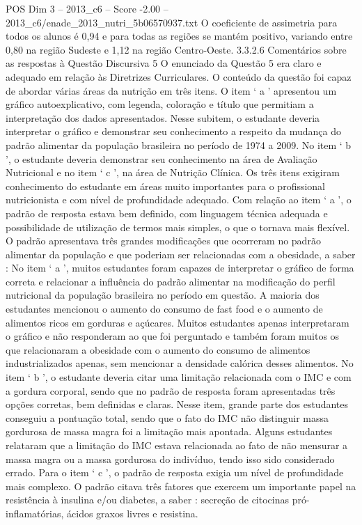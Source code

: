\begin{textsample}{POS Dim 3 – 2013\_c6 – Score -2.00 – 2013\_c6/enade\_2013\_nutri\_5b06570937.txt}
O coeficiente de assimetria para todos os alunos é 0,94 e para todas as regiões se mantém positivo, variando entre 0,80 na região Sudeste e 1,12 na região Centro-Oeste. 3.3.2.6 Comentários sobre as respostas à Questão Discursiva 5 O enunciado da Questão 5 era claro e adequado em relação às Diretrizes Curriculares.
O conteúdo da questão foi capaz de abordar várias áreas da nutrição em três itens.
O item ‘ a ’ apresentou um gráfico autoexplicativo, com legenda, coloração e título que permitiam a interpretação dos dados apresentados.
Nesse subitem, o estudante deveria interpretar o gráfico e demonstrar seu conhecimento a respeito da mudança do padrão alimentar da população brasileira no período de 1974 a 2009.
No item ‘ b ’, o estudante deveria demonstrar seu conhecimento na área de Avaliação Nutricional e no item ‘ c ’, na área de Nutrição Clínica.
Os três itens exigiram conhecimento do estudante em áreas muito importantes para o profissional nutricionista e com nível de profundidade adequado.
Com relação ao item ‘ a ’, o padrão de resposta estava bem definido, com linguagem técnica adequada e possibilidade de utilização de termos mais simples, o que o tornava mais flexível.
O padrão apresentava três grandes modificações que ocorreram no padrão alimentar da população e que poderiam ser relacionadas com a obesidade, a saber : No item ‘ a ’, muitos estudantes foram capazes de interpretar o gráfico de forma correta e relacionar a influência do padrão alimentar na modificação do perfil nutricional da população brasileira no período em questão.
A maioria dos estudantes mencionou o aumento do consumo de fast food e o aumento de alimentos ricos em gorduras e açúcares.
Muitos estudantes apenas interpretaram o gráfico e não responderam ao que foi perguntado e também foram muitos os que relacionaram a obesidade com o aumento do consumo de alimentos industrializados apenas, sem mencionar a densidade calórica desses alimentos.
No item ‘ b ’, o estudante deveria citar uma limitação relacionada com o IMC e com a gordura corporal, sendo que no padrão de resposta foram apresentadas três opções corretas, bem definidas e claras.
Nesse item, grande parte dos estudantes conseguiu a pontuação total, sendo que o fato do IMC não distinguir massa gordurosa de massa magra foi a limitação mais apontada.
Alguns estudantes relataram que a limitação do IMC estava relacionada ao fato de não mensurar a massa magra ou a massa gordurosa do indivíduo, tendo isso sido considerado errado.
Para o item ‘ c ’, o padrão de resposta exigia um nível de profundidade mais complexo.
O padrão citava três fatores que exercem um importante papel na resistência à insulina e/ou diabetes, a saber : secreção de citocinas pró-inflamatórias, ácidos graxos livres e resistina.

\end{textsample}
